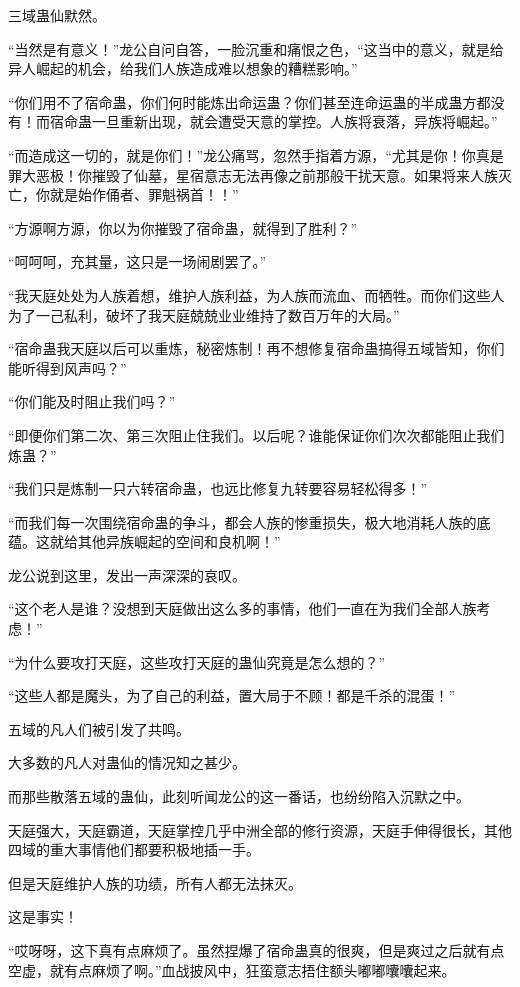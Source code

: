 \begin{this_body}
三域蛊仙默然。

“当然是有意义！”龙公自问自答，一脸沉重和痛恨之色，“这当中的意义，就是给异人崛起的机会，给我们人族造成难以想象的糟糕影响。”

“你们用不了宿命蛊，你们何时能炼出命运蛊？你们甚至连命运蛊的半成蛊方都没有！而宿命蛊一旦重新出现，就会遭受天意的掌控。人族将衰落，异族将崛起。”

“而造成这一切的，就是你们！”龙公痛骂，忽然手指着方源，“尤其是你！你真是罪大恶极！你摧毁了仙墓，星宿意志无法再像之前那般干扰天意。如果将来人族灭亡，你就是始作俑者、罪魁祸首！！”

“方源啊方源，你以为你摧毁了宿命蛊，就得到了胜利？”

“呵呵呵，充其量，这只是一场闹剧罢了。”

“我天庭处处为人族着想，维护人族利益，为人族而流血、而牺牲。而你们这些人为了一己私利，破坏了我天庭兢兢业业维持了数百万年的大局。”

“宿命蛊我天庭以后可以重炼，秘密炼制！再不想修复宿命蛊搞得五域皆知，你们能听得到风声吗？”

“你们能及时阻止我们吗？”

“即便你们第二次、第三次阻止住我们。以后呢？谁能保证你们次次都能阻止我们炼蛊？”

“我们只是炼制一只六转宿命蛊，也远比修复九转要容易轻松得多！”

“而我们每一次围绕宿命蛊的争斗，都会人族的惨重损失，极大地消耗人族的底蕴。这就给其他异族崛起的空间和良机啊！”

龙公说到这里，发出一声深深的哀叹。

“这个老人是谁？没想到天庭做出这么多的事情，他们一直在为我们全部人族考虑！”

“为什么要攻打天庭，这些攻打天庭的蛊仙究竟是怎么想的？”

“这些人都是魔头，为了自己的利益，置大局于不顾！都是千杀的混蛋！”

五域的凡人们被引发了共鸣。

大多数的凡人对蛊仙的情况知之甚少。

而那些散落五域的蛊仙，此刻听闻龙公的这一番话，也纷纷陷入沉默之中。

天庭强大，天庭霸道，天庭掌控几乎中洲全部的修行资源，天庭手伸得很长，其他四域的重大事情他们都要积极地插一手。

但是天庭维护人族的功绩，所有人都无法抹灭。

这是事实！

“哎呀呀，这下真有点麻烦了。虽然捏爆了宿命蛊真的很爽，但是爽过之后就有点空虚，就有点麻烦了啊。”血战披风中，狂蛮意志捂住额头嘟嘟囔囔起来。


\end{this_body}
